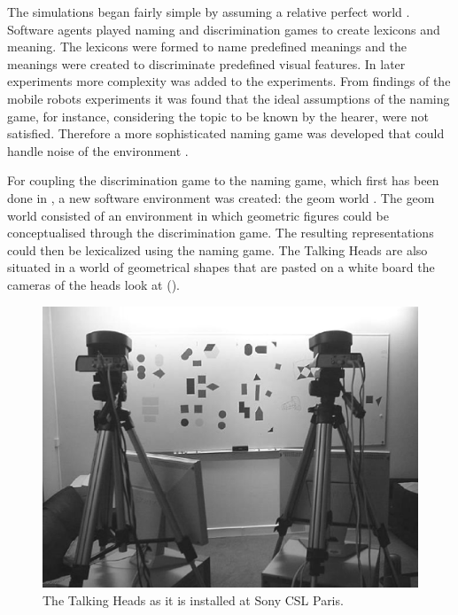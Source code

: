 The simulations began fairly simple by assuming a relative perfect world \citep{steels:1996a,steels:1996b}. Software agents played naming and discrimination games to create lexicons and meaning. The lexicons were formed to name predefined meanings and the meanings were created to discriminate predefined visual features. In later experiments more complexity was added to the experiments. From findings of the mobile robots experiments \citep{vogt:1998a} it was found that the ideal assumptions of the naming game, for instance, considering the topic to be known by the hearer, were not satisfied. Therefore a more sophisticated naming game was developed that could handle noise of the environment \citep{steelskaplan:1998}. 

For coupling the discrimination game to the naming game, which first has been done in \citet{steelsvogt:1997}, a new software environment was created: the {\sc geom} world \citep{steels:2000}. The {\sc geom} world consisted of an environment in which geometric figures could be conceptualised through the discrimination game. The resulting representations could then be lexicalized using the naming game. The Talking Heads are also situated in a world of geometrical shapes that are pasted on a white board the cameras of the heads look at ().

\begin{figure}[t]
\centering
\includegraphics[width=\textwidth]{theory/th.eps}
\caption{The Talking Heads as it is installed at Sony CSL Paris.}
\label{f:theory:talkingheads}
\end{figure}

